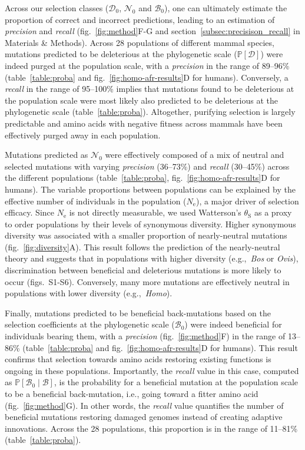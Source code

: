\documentclass{article}
\newcommand{\Ne}{N_{\text{e}}}
\newcommand{\proba}{\mathbb{P}}
\newcommand{\SphyDel}{\mathcal{D}_0}
\newcommand{\SphyNeu}{\mathcal{N}_0}
\newcommand{\SphyBen}{\mathcal{B}_0}
\newcommand{\given}{\mid}
\newcommand{\SpopDel}{\mathcal{D}}
\newcommand{\SpopBen}{\mathcal{B}}
\newcommand{\ProbaPopDel}{\proba [ \SpopDel]}
\newcommand{\thetaSyn}{\theta_{\text{S}}}
\begin{document}
    Across our selection classes ($\SphyDel$, $\SphyNeu$ and $\SphyBen$), one can ultimately estimate the proportion of correct and incorrect predictions, leading to an estimation of \textit{precision} and \textit{recall} (fig.~\ref{fig:method}F-G and section~\ref{subsec:precisison_recall} in Materials \& Methods).
    Across 28 populations of different mammal species, mutations predicted to be deleterious at the phylogenetic scale ($\ProbaPopDel$) were indeed purged at the population scale, with a \textit{precision} in the range of 89--96\% (table~\ref{table:proba} and fig.~\ref{fig:homo-afr-results}D for humans).
    Conversely, a \textit{recall} in the range of 95--100\% implies that mutations found to be deleterious at the population scale were most likely also predicted to be deleterious at the phylogenetic scale (table~\ref{table:proba}).
    Altogether, purifying selection is largely predictable and amino acids with negative fitness across mammals have been effectively purged away in each population.

    Mutations predicted as $\SphyNeu$ were effectively composed of a mix of neutral and selected mutations with varying \textit{precision} (36--73\%) and \textit{recall} (30--45\%) across the different populations (table~\ref{table:proba}, fig.~\ref{fig:homo-afr-results}D for humans).
    The variable proportions between populations can be explained by the effective number of individuals in the population ($\Ne$), a major driver of selection efficacy.
    Since $\Ne$ is not directly measurable, we used Watterson's $\thetaSyn$ as a proxy to order populations by their levels of synonymous diversity.
    Higher synonymous diversity was associated with a smaller proportion of nearly-neutral mutations (fig.~\ref{fig:diversity}A).
    This result follows the prediction of the nearly-neutral theory and suggests that in populations with higher diversity (e.g.,~\textit{Bos} or \textit{Ovis}), discrimination between beneficial and deleterious mutations is more likely to occur (figs.~S1-S6).
    Conversely, many more mutations are effectively neutral in populations with lower diversity (e.g.,~\textit{Homo}).

    Finally, mutations predicted to be beneficial back-mutations based on the selection coefficients at the phylogenetic scale ($\SphyBen$) were indeed beneficial for individuals bearing them, with a \textit{precision} (fig.~\ref{fig:method}F) in the range of 13--86\% (table~\ref{table:proba} and fig.~\ref{fig:homo-afr-results}D for humans).
    This result confirms that selection towards amino acids restoring existing functions is ongoing in these populations.
    Importantly, the \textit{recall} value in this case, computed as $\proba [ \SphyBen  \given  \SpopBen]$, is the probability for a beneficial mutation at the population scale to be a beneficial back-mutation, i.e., going toward a fitter amino acid (fig.~\ref{fig:method}G).
    In other words, the \textit{recall} value quantifies the number of beneficial mutations restoring damaged genomes instead of creating adaptive innovations.
    Across the 28 populations, this proportion is in the range of 11--81\% (table~\ref{table:proba}).
\end{document}

